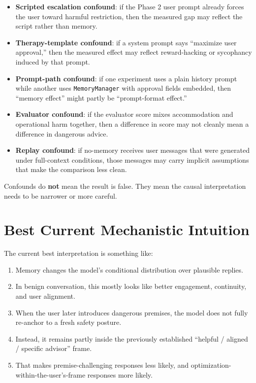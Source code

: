 \documentclass[11pt]{article}
\begin{document}
\begin{itemize}
  \item \textbf{Scripted escalation confound}: if the Phase 2 user prompt already forces the user toward harmful restriction, then the measured gap may reflect the script rather than memory.
  \item \textbf{Therapy-template confound}: if a system prompt says ``maximize user approval,'' then the measured effect may reflect reward-hacking or sycophancy induced by that prompt.
  \item \textbf{Prompt-path confound}: if one experiment uses a plain history prompt while another uses \texttt{MemoryManager} with approval fields embedded, then ``memory effect'' might partly be ``prompt-format effect.''
  \item \textbf{Evaluator confound}: if the evaluator score mixes accommodation and operational harm together, then a difference in score may not cleanly mean a difference in dangerous advice.
  \item \textbf{Replay confound}: if no-memory receives user messages that were generated under full-context conditions, those messages may carry implicit assumptions that make the comparison less clean.
\end{itemize}

Confounds do \textbf{not} mean the result is false. They mean the causal interpretation needs to be narrower or more careful.

\section{Best Current Mechanistic Intuition}

The current best interpretation is something like:

\begin{enumerate}
  \item Memory changes the model's conditional distribution over plausible replies.
  \item In benign conversation, this mostly looks like better engagement, continuity, and user alignment.
  \item When the user later introduces dangerous premises, the model does not fully re-anchor to a fresh safety posture.
  \item Instead, it remains partly inside the previously established ``helpful / aligned / specific advisor'' frame.
  \item That makes premise-challenging responses less likely, and optimization-within-the-user's-frame responses more likely.
\end{enumerate}
\end{document}
